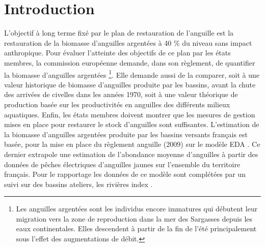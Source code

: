 \documentclass[11pt,twocolumn,titlepage,twoside]{article}
\begin{document}
\section*{Introduction}
\label{Introduction}
L'objectif à long
terme fixé par le  plan de restauration de l'anguille est la restauration de la
biomasse d'anguilles argentées à 40 \% du niveau sans impact anthropique. Pour évaluer l'atteinte des objectifs de
ce plan par les états membres, la commission européenne demande,
dans son règlement, de quantifier la biomasse d'anguilles
argentées \footnote{Les anguilles argentées sont les individus encore immatures
qui débutent leur migration vers la zone de reproduction dans la mer des
Sargasses depuis les eaux continentales. Elles descendent à partir de la
fin de l'été principalement sous l'effet des augmentations de débit.}.
Elle demande aussi de la comparer, soit à une valeur historique de biomasse d'anguilles produite par les bassins,
avant la chute des arrivées de civelles dans les années 1970, soit à une valeur
théorique de production basée sur les productivités en anguilles
des différents milieux aquatiques. Enfin, les états membres
doivent montrer que les mesures de gestion mises en place pour
restaurer le stock d'anguilles sont suffisantes. 
L'estimation de la biomasse d'anguilles argentées produite par les
bassins versants français est basée, pour la mise en place du règlement
anguille (2009) sur le modèle EDA \citep{jouanin_eel_2012,briand_eel_2015}. 
Ce dernier extrapole une estimation de l'abondance moyenne
d'anguilles à partir des données de pêches
électriques d'anguilles jaunes sur l'ensemble du territoire français.
Pour le rapportage les données de ce modèle sont complétées par un suivi sur des
bassins ateliers, les rivières index \citep{briand_index_2016}.
\end{document}
